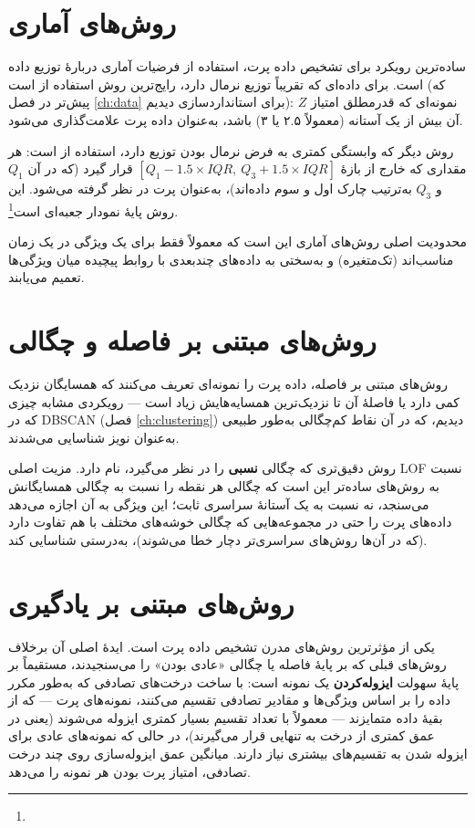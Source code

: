 \section{روش‌های آماری}

ساده‌ترین رویکرد برای تشخیص داده پرت، استفاده از فرضیات آماری دربارهٔ
توزیع داده است. برای داده‌ای که تقریباً توزیع نرمال دارد، رایج‌ترین
روش استفاده از  است (که پیش‌تر
در فصل \ref{ch:data} برای استانداردسازی دیدیم): نمونه‌ای که قدرمطلق
امتیاز $Z$ آن بیش از یک آستانه (معمولاً ۲.۵ یا ۳) باشد، به‌عنوان داده
پرت علامت‌گذاری می‌شود.

روش دیگر که وابستگی کمتری به فرض نرمال بودن توزیع دارد، استفاده از
 است: هر
مقداری که خارج از بازهٔ
$[Q_1 - 1.5 \times IQR,\ Q_3 + 1.5 \times IQR]$ قرار گیرد (که در آن
$Q_1$ و $Q_3$ به‌ترتیب چارک اول و سوم داده‌اند)، به‌عنوان پرت در نظر
گرفته می‌شود. این روش پایهٔ نمودار جعبه‌ای است\footnote{}.

محدودیت اصلی روش‌های آماری این است که معمولاً فقط برای یک ویژگی در یک
زمان مناسب‌اند (تک‌متغیره) و به‌سختی به داده‌های چندبعدی با روابط
پیچیده میان ویژگی‌ها تعمیم می‌یابند.

\section{روش‌های مبتنی بر فاصله و چگالی}

روش‌های مبتنی بر فاصله، داده پرت را نمونه‌ای تعریف می‌کنند که همسایگان
نزدیک کمی دارد یا فاصلهٔ آن تا نزدیک‌ترین همسایه‌هایش زیاد است — رویکردی
مشابه چیزی که در DBSCAN (فصل \ref{ch:clustering}) دیدیم، که در آن نقاط
کم‌چگالی به‌طور طبیعی به‌عنوان نویز شناسایی می‌شدند.

روش دقیق‌تری که چگالی \textbf{نسبی} را در نظر می‌گیرد،
 نام دارد.
مزیت اصلی LOF نسبت به روش‌های ساده‌تر این است که چگالی هر نقطه را نسبت
به چگالی همسایگانش می‌سنجد، نه نسبت به یک آستانهٔ سراسری ثابت؛ این
ویژگی به آن اجازه می‌دهد داده‌های پرت را حتی در مجموعه‌هایی که چگالی
خوشه‌های مختلف با هم تفاوت دارد (که در آن‌ها روش‌های سراسری‌تر دچار خطا
می‌شوند)، به‌درستی شناسایی کند.

\section{روش‌های مبتنی بر یادگیری}

 یکی از مؤثرترین
روش‌های مدرن تشخیص داده پرت است. ایدهٔ اصلی آن برخلاف روش‌های قبلی که
بر پایهٔ فاصله یا چگالی «عادی بودن» را می‌سنجیدند، مستقیماً بر پایهٔ
سهولت \textbf{ایزوله‌کردن} یک نمونه است: با ساخت درخت‌های تصادفی که
به‌طور مکرر داده را بر اساس ویژگی‌ها و مقادیر تصادفی تقسیم می‌کنند،
نمونه‌های پرت — که از بقیهٔ داده متمایزند — معمولاً با تعداد تقسیم بسیار
کمتری ایزوله می‌شوند (یعنی در عمق کمتری از درخت به تنهایی قرار
می‌گیرند)، در حالی که نمونه‌های عادی برای ایزوله شدن به تقسیم‌های بیشتری
نیاز دارند. میانگین عمق ایزوله‌سازی روی چند درخت تصادفی، امتیاز پرت
بودن هر نمونه را می‌دهد.

